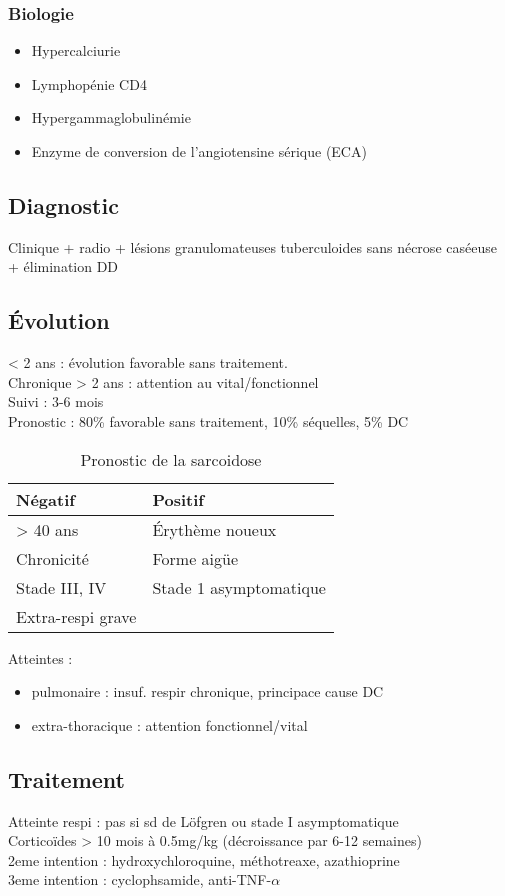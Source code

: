 \documentclass{article}
\begin{document}
\subsubsection{Biologie}
\label{sec:orgbfe5d87}
\begin{itemize}
\item Hypercalciurie
\item Lymphopénie CD4
\item Hypergammaglobulinémie
\item Enzyme de conversion de l'angiotensine sérique (ECA)
\end{itemize}
\subsection{Diagnostic}
\label{sec:org6670330}
Clinique + radio + lésions granulomateuses tuberculoides sans nécrose caséeuse +
élimination DD
\subsection{Évolution}
\label{sec:org707f9ea}
< 2 ans : évolution favorable sans traitement.\\
Chronique > 2 ans : attention au vital/fonctionnel \\
Suivi : 3-6 mois\\
Pronostic : 80\% favorable sans traitement, 10\% séquelles, 5\% DC

\begin{table}[htbp]
\caption{Pronostic de la sarcoidose}
\centering
\begin{tabular}{ll}
\toprule
Négatif & Positif\\
\midrule
> 40 ans & Érythème noueux\\
Chronicité & Forme aigüe\\
Stade III, IV & Stade 1 asymptomatique\\
Extra-respi grave & \\
\bottomrule
\end{tabular}
\end{table}

Atteintes :
\begin{itemize}
\item pulmonaire : insuf. respir chronique, principace cause DC
\item extra-thoracique : attention fonctionnel/vital
\end{itemize}

\subsection{Traitement}
\label{sec:orgc05b9f6}
Atteinte respi : pas si sd de Löfgren ou stade I asymptomatique\\
Corticoïdes > 10 mois à 0.5mg/kg (décroissance par 6-12 semaines)\\
2eme intention : hydroxychloroquine, méthotreaxe, azathioprine\\
3eme intention : cyclophsamide, anti-TNF-\(\alpha\)
\end{document}
